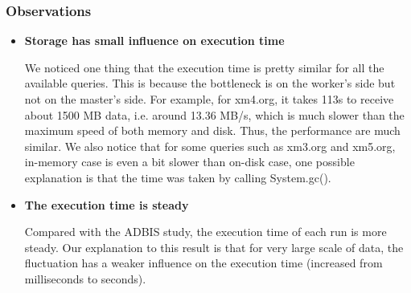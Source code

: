 \subsubsection{Observations}

\begin{itemize}
\item \textbf{Storage has small influence on execution time}
 
We noticed one thing that the execution time is pretty similar for
all the available queries. This is because the bottleneck is on the
worker's side but not on the master's side. For example, for xm4.org,
it takes 113s to receive about 1500 MB data, i.e. around 13.36 MB/s, 
which is much slower than the maximum speed of both memory and disk. 
Thus, the performance are much similar. We also notice that for some
queries such as xm3.org and xm5.org, in-memory case is even a bit 
slower than on-disk case, one possible explanation is that the time 
was taken by calling System.gc(). 


\item \textbf{The execution time is steady}

Compared with the ADBIS study, the execution time of each run is more
steady. Our explanation to this result is that for very large scale
of data, the fluctuation has a weaker influence on the execution
time (increased from milliseconds to seconds). 


\end{itemize}


 